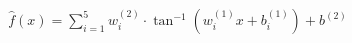 \documentclass[preview]{standalone}
\begin{document}
\begin{align*}
\hat{f}(x) = \sum_{i=1}^{5} w^{(2)}_i \cdot \tan^{-1} \left( w^{(1)}_i x + b^{(1)}_i \right) + b^{(2)}
\end{align*}
\end{document}

